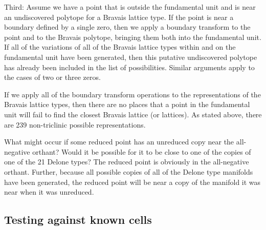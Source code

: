 \documentclass[preprint]{iucr}              %
\begin{document}
Third: Assume we have a point that is outside the fundamental 
unit and is near an undiscovered polytope for a Bravais lattice 
type. If the point is near a boundary defined by a single 
zero, then we apply a boundary transform to the point and to 
the Bravais polytope, bringing them both into the fundamental 
unit. If all of the variations of all of the Bravais 
lattice types within and on the fundamental unit have 
been generated, then this putative undiscovered polytope 
has already been included in the list of possibilities. 
Similar arguments apply to the cases of two or three zeros.

If we apply all of the boundary transform operations to the 
representations of the Bravais lattice types, then 
there are no places that a point in the fundamental 
unit will fail to find the closest Bravais lattice 
(or lattices). As stated above, there are 239 
non-triclinic possible representations.

What might occur if some reduced point has an unreduced 
copy near the all-negative orthant?  Would it be 
possible for it to be close to one of the copies of one 
of the 21 Delone types? The reduced point is obviously in 
the all-negative orthant. Further, because all possible 
copies of all of the Delone type manifolds have been 
generated, the reduced point will be near a copy of the 
manifold it was near when it was unreduced.

\subsection{Testing against known cells}
\end{document}
